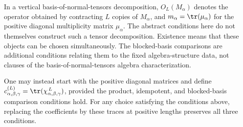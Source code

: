 \begin{definition}
    In a vertical basis-of-normal-tensors decomposition, $O_L(M_\alpha)$ denotes the operator
    obtained by contracting $L$ copies of $M_\alpha$, and
    $m_\alpha=\tr(\mu_\alpha)$ for the positive diagonal multiplicity
    matrix $\mu_\alpha$. The abstract conditions here do not themselves
    construct such a tensor decomposition.
    Existence means that these objects can be chosen simultaneously.
    The blocked-basis comparisons are additional conditions relating them
    to the fixed algebra-structure data, not clauses of the basis-of-normal-tensors
    algebra characterization.

    One may instead start with the positive diagonal matrices and define
    $c^{(L)}_{\alpha,\beta,\gamma}
        =\tr(\chi_{\alpha,\beta,\gamma}^{\,L})$,
    provided the product, idempotent, and blocked-basis comparison
    conditions hold. For any choice satisfying the conditions above,
    replacing the coefficients by these traces at positive lengths
    preserves all three conditions.
\end{definition}

